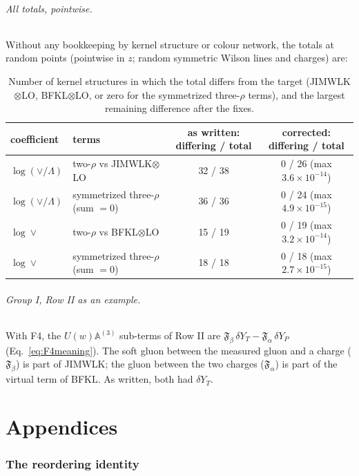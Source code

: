 \documentclass[10pt]{article}
\numberwithin{equation}{section}
\begin{document}
\paragraph{All totals, pointwise.} Without any bookkeeping by kernel structure or colour network, the totals at random points (pointwise in $z$; random symmetric Wilson lines and charges) are:
\begin{table}[H]
\centering\small
\begin{tabular}{@{}l l c c@{}}
coefficient & terms & as written: differing / total & corrected: differing / total\\ \hline
$\log(\vee/\Lambda)$ & two-$\rho$ vs JIMWLK$\otimes$LO & 32 / 38 & 0 / 26 (max $3.6\times10^{-14}$)\\
$\log(\vee/\Lambda)$ & symmetrized three-$\rho$ (sum $=0$) & 36 / 36 & 0 / 24 (max $4.9\times10^{-15}$)\\
$\log\vee$ & two-$\rho$ vs BFKL$\otimes$LO & 15 / 19 & 0 / 19 (max $3.2\times10^{-14}$)\\
$\log\vee$ & symmetrized three-$\rho$ (sum $=0$) & 18 / 18 & 0 / 18 (max $2.7\times10^{-15}$)\\
\end{tabular}
\caption{Number of kernel structures in which the total differs from the target (JIMWLK$\otimes$LO, BFKL$\otimes$LO, or zero for the symmetrized three-$\rho$ terms), and the largest remaining difference after the fixes.}
\label{tab:allstates}
\end{table}

\paragraph{Group I, Row II as an example.} With F4, the $U(w)\mathbb A^{(3)}$ sub-terms of Row II are $\mathfrak F_\beta\,\delta Y_T-\mathfrak F_\alpha\,\delta Y_P$ (Eq.~\eqref{eq:F4meaning}). The soft gluon between the measured gluon and a charge ($\mathfrak F_\beta$) is part of JIMWLK; the gluon between the two charges ($\mathfrak F_\alpha$) is part of the virtual term of BFKL. As written, both had $\delta Y_T$.

\clearpage
\appendix
\part*{Appendices}
\section{The reordering identity}\label{R:sec:identity}\label{app:reorder}
\end{document}

